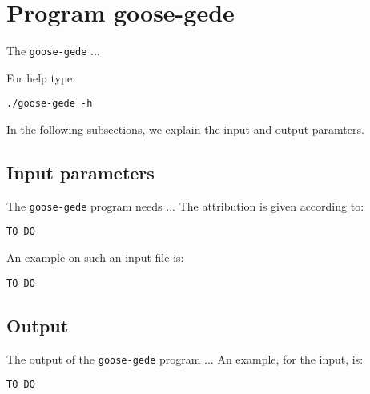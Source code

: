 \section{Program goose-gede}
The \texttt{goose-gede} ...

For help type:
\begin{lstlisting}
./goose-gede -h
\end{lstlisting}
In the following subsections, we explain the input and output paramters.

\subsection*{Input parameters}

The \texttt{goose-gede} program needs ...
The attribution is given according to:
\begin{lstlisting}
TO DO
\end{lstlisting}

An example on such an input file is:
\begin{lstlisting}
TO DO
\end{lstlisting}

\subsection*{Output}
The output of the \texttt{goose-gede} program ...
An example, for the input, is:
\begin{lstlisting}
TO DO
\end{lstlisting}
